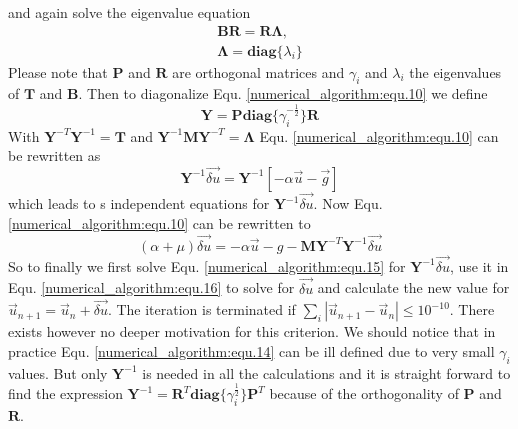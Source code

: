and again solve the eigenvalue equation
\begin{equation}
	\begin{gathered}
		\mathbf{B} \mathbf{R} = \mathbf{R} \mathbf{\Lambda},\\
		\mathbf{\Lambda} = \mathbf{diag} \{\lambda_i\}
	\end{gathered}
	\label{numerical_algorithm:equ.13}
\end{equation}
Please note that $\mathbf{P}$ and $\mathbf{R}$ are orthogonal matrices and $\gamma_i$ and $\lambda_i$ the eigenvalues of $\mathbf{T}$ and $\mathbf{B}$. Then to diagonalize Equ. \ref{numerical_algorithm:equ.10} we define 
\begin{equation}
	\mathbf{Y} = \mathbf{P} \mathbf{diag}\{ \gamma_i^{-\frac{1}{2}}\} \mathbf{R}
	\label{numerical_algorithm:equ.14}
\end{equation}
With $\mathbf{Y}^{-T}\mathbf{Y}^{-1} = \mathbf{T}$ and $\mathbf{Y}^{-1}\mathbf{M}\mathbf{Y}^{-T} = \mathbf{\Lambda}$ Equ. 
\ref{numerical_algorithm:equ.10}
can be rewritten as
\begin{equation}
	[( \alpha + \mu) \mathbf{I} +\mathbf{\Lambda}]\mathbf{Y}^{-1} \vec{\delta u} = \mathbf{Y}^{-1}[ -\alpha \vec u - \vec g]
	\label{numerical_algorithm:equ.15}
\end{equation}
which leads to s independent equations for $\mathbf{Y}^{-1} \vec{\delta u}$.
Now Equ. \ref{numerical_algorithm:equ.10} can be rewritten to
\begin{equation}
	(\alpha + \mu)\vec{\delta u} = -\alpha \vec u - g - \mathbf{M}\mathbf{Y}^{-T}\mathbf{Y}^{-1} \vec{\delta u}
	\label{numerical_algorithm:equ.16}
\end{equation}
So to finally we first solve Equ. \ref{numerical_algorithm:equ.15} for $\mathbf{Y}^{-1} \vec{\delta u}$, use it in Equ. \ref{numerical_algorithm:equ.16} to solve for $\vec{\delta u}$ and calculate the new value for $\vec u_{n+1} = \vec u_{n} + \vec{\delta u}$. The iteration is terminated if $\sum_i |\vec u_{n+1} - \vec u_{n}| \leq 10^{-10}$. There exists however no deeper motivation for this criterion. We should notice that in practice Equ. \ref{numerical_algorithm:equ.14} can be ill defined due to very small $\gamma_i$ values. But only $\mathbf{Y}^{-1}$ is needed in all the calculations and it is straight forward to find the expression $\mathbf{Y}^{-1} = \mathbf{R}^T \mathbf{diag} \{ \gamma_i^{\frac{1}{2}}\}\mathbf{P}^T$ because of the orthogonality of $\mathbf{P}$ and $\mathbf{R}$.
